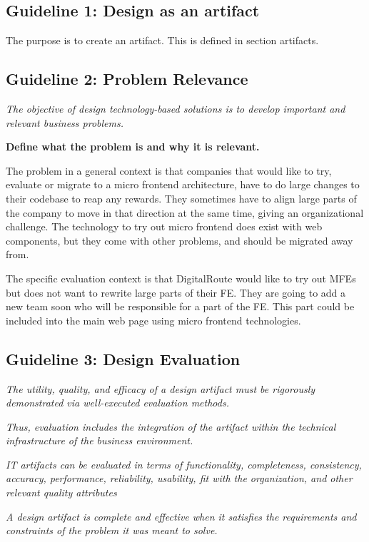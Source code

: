 \subsection{Guideline 1: Design as an artifact}
The purpose is to create an artifact. This is defined in section artifacts.

\subsection{Guideline 2: Problem Relevance}
\textit{The objective of design technology-based solutions is to develop important and relevant business problems.}

\textbf{Define what the problem is and why it is relevant.}

The problem in a general context is that companies that would like to try, evaluate or migrate to a micro frontend architecture, have to do large changes to their codebase to reap any rewards. They sometimes have to align large parts of the company to move in that direction at the same time, giving an organizational challenge. The technology to try out micro frontend does exist with web components, but they come with other problems, and should be migrated away from.

The specific evaluation context is that DigitalRoute would like to try out \acp{MFE} but does not want to rewrite large parts of their \ac{FE}. They are going to add a new team soon who will be responsible for a part of the \ac{FE}. This part could be included into the main web page using micro frontend technologies.

\subsection{Guideline 3: Design Evaluation}
\textit{The utility, quality, and efficacy of a design artifact must be rigorously demonstrated via well-executed evaluation methods.}

\textit{Thus, evaluation includes the integration of the artifact within the technical infrastructure of the business environment.}

\textit{IT artifacts can be evaluated in terms of functionality, completeness, consistency, accuracy, performance, reliability, usability, fit with the organization, and other relevant quality attributes}

\textit{A design artifact is complete and effective when it satisfies the requirements and constraints of the problem it was meant to solve.}

